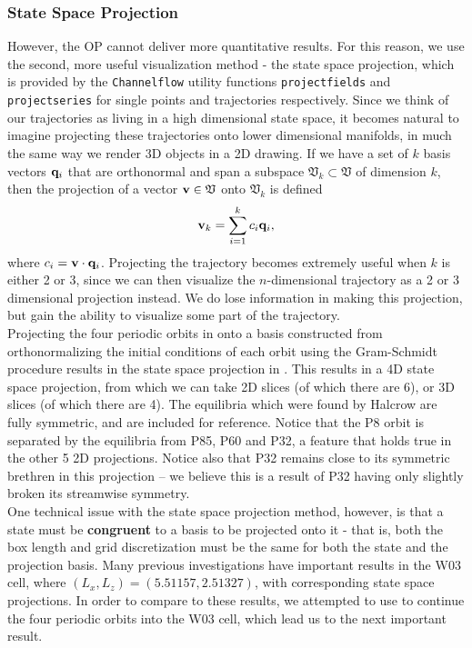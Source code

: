 \subsubsection{State Space Projection}
However, the OP cannot deliver more quantitative results. For this reason, we use the second, more useful visualization method - the state space projection, which is provided by the {\tt Channelflow} utility functions {\tt projectfields} and {\tt projectseries} for single points and trajectories respectively. Since we think of our trajectories as living in a high dimensional state space, it becomes natural to imagine projecting these trajectories onto lower dimensional manifolds, in much the same way we render 3D objects in a 2D drawing. If we have a set of $k$ basis vectors $\mathbf{q}_i$ that are orthonormal and span a subspace $\mathfrak{V}_k \subset \mathfrak{V}$ of dimension $k$, then the projection of a vector $\mathbf{v} \in \mathfrak{V}$ onto $\mathfrak{V}_k$ is defined 
\begin{equation}
\Vector{v}_k = \sum{i = 1}{k}{c_i \Vector{q}_i},
\end{equation}
where $c_i = \mathbf{v} \cdot \mathbf{q}_i$. Projecting the trajectory becomes extremely useful when $k$ is either 2 or 3, since we can then visualize the $n$-dimensional trajectory as a 2 or 3 dimensional projection instead. We do lose information in making this projection, but gain the ability to visualize some part of the trajectory. \\
Projecting the four periodic orbits in  onto a basis constructed from orthonormalizing the initial conditions of each orbit using the Gram-Schmidt procedure results in the state space projection in . This results in a 4D state space projection, from which we can take 2D slices (of which there are 6), or 3D slices (of which there are 4). The equilibria which were found by Halcrow are fully symmetric, and are included for reference.  Notice that the P8 orbit is separated by the equilibria from P85, P60 and P32, a feature that holds true in the other 5 2D projections. Notice also that P32 remains close to its symmetric brethren in this projection -- we believe this is a result of P32 having only slightly broken its streamwise symmetry. \\

One technical  issue with the state space projection method, however, is that a state must be {\bf congruent} to a basis to be projected onto it - that is, both the box length and grid discretization must be the same for both the state and the projection basis. Many previous investigations have important results in the W03 cell, where $(L_x,L_z) = (5.51157,2.51327)$, with corresponding state space projections. In order to compare to these results, we attempted to use  to continue the four periodic orbits into the W03 cell, which lead us to the next important result.

